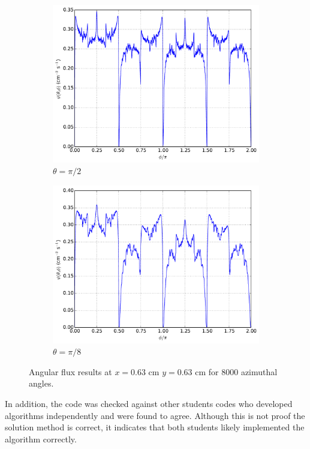 \documentclass[12pt]{article}
\newenvironment{solution}[1][Solution]{\begin{trivlist}
\item[\hskip \labelsep {\bfseries #1} {\hspace{-0.2em}\bfseries:}]\hspace{0.3in}\newline}{\end{trivlist}}
\begin{document}
\begin{solution}
\begin{figure}
\begin{subfigure}{0.5\textwidth}
\includegraphics[width=1.0\textwidth]{r4141pi2.pdf}
\caption{$\theta=\pi/2$}
    \end{subfigure}
    \begin{subfigure}{0.5\textwidth}
\centering
\includegraphics[width=1.0\textwidth]{r4141pi8.pdf}
\caption{$\theta=\pi/8$}
    \end{subfigure}
    \caption{Angular flux results at $x=0.63$ cm $y=0.63$ cm for 8000 azimuthal angles.}
\end{figure}

In addition, the code was checked against other students codes who developed
algorithms independently and were found to agree.  Although this is not proof the
solution method is correct, it indicates that both students likely implemented the
algorithm correctly.




\end{solution}
\end{document}
